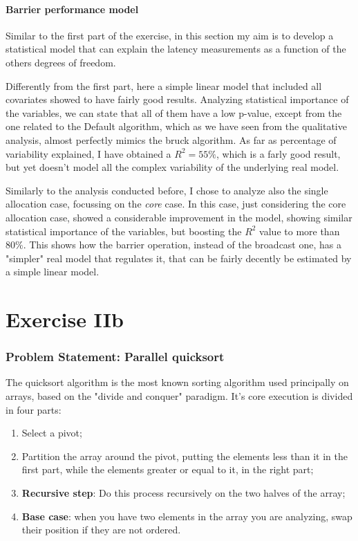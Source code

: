 \documentclass{article}
\begin{document}
	\subsection{Barrier performance model}
	
	Similar to the first part of the exercise, in this section my aim is to develop a statistical model that can explain the latency measurements as a function of the others degrees of freedom.
	
	Differently from the first part, here a simple linear model that included all covariates showed to have fairly good results.
	Analyzing statistical importance of the variables, we can state that all of them have a low p-value, except from the one related to the Default algorithm, which as we have seen from the qualitative analysis, almost perfectly mimics the bruck algorithm.
	As far as percentage of variability explained, I have obtained a $R^2=55\%$, which is a farly good result, but yet doesn't model all the complex variability of the underlying real model.
	
	
	
	Similarly to the analysis conducted before, I chose to analyze also the single allocation case, focussing on the \textit{core} case.
	In this case, just considering the core allocation case, showed a considerable improvement in the model, showing similar statistical importance of the variables, but boosting the $R^2$ value to more than $80\%$. This shows how the barrier operation, instead of the broadcast one, has a "simpler" real model that regulates it, that can be fairly decently be estimated by a simple linear model.
	
	
	
	
	\newpage
	
	\part{Exercise IIb}
	
	\section{Problem Statement: Parallel quicksort}
	
	The quicksort algorithm is the most known sorting algorithm used principally on arrays, based on the "divide and conquer" paradigm.
	It's core execution is divided in four parts:
	\begin{enumerate}
		\item Select a pivot;
		\item Partition the array around the pivot, putting the elements less than it in the first part, while the elements greater or equal to it, in the right part;
		\item \textbf{Recursive step}: Do this process recursively on the two halves of the array;
		\item \textbf{Base case}: when you have two elements in the array you are analyzing, swap their position if they are not ordered.
	\end{enumerate}
	
\end{document}
